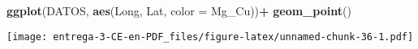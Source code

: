 \documentclass[
]{article}
\newenvironment{Shaded}{\begin{snugshade}}{\end{snugshade}}
\newcommand{\DataTypeTok}[1]{\textcolor[rgb]{0.13,0.29,0.53}{#1}}
\newcommand{\DecValTok}[1]{\textcolor[rgb]{0.00,0.00,0.81}{#1}}
\newcommand{\KeywordTok}[1]{\textcolor[rgb]{0.13,0.29,0.53}{\textbf{#1}}}
\newcommand{\NormalTok}[1]{#1}
\newcommand{\OperatorTok}[1]{\textcolor[rgb]{0.81,0.36,0.00}{\textbf{#1}}}
\newcommand{\StringTok}[1]{\textcolor[rgb]{0.31,0.60,0.02}{#1}}
\begin{document}
\begin{Shaded}
\begin{Highlighting}[]
\KeywordTok{ggplot}\NormalTok{(DATOS, }\KeywordTok{aes}\NormalTok{(Long, Lat, }\DataTypeTok{color =}\NormalTok{ Mg_Cu))}\OperatorTok{+}
\StringTok{  }\KeywordTok{geom_point}\NormalTok{()}
\end{Highlighting}
\end{Shaded}

\texttt{[image: entrega-3-CE-en-PDF\_files/figure-latex/unnamed-chunk-36-1.pdf]}

\begin{Shaded}
\end{Shaded}
\end{document}
